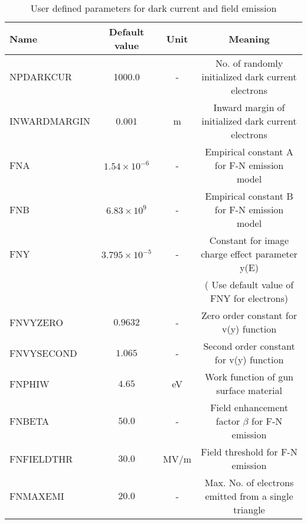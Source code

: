 \documentclass[a4paper,11pt]{article}
\begin{document}
\begin{table}[H]
\small
\caption{User defined parameters for dark current and field emission} %
\centering %
\begin{tabular}{lccc} %

 
\hline\hline %
Name & Default value & Unit & Meaning \\ [0.5ex] %
\hline %
NPDARKCUR & 1000.0 & - & No. of randomly initialized dark current electrons\\ %
INWARDMARGIN & 0.001 & m & Inward margin of initialized dark current electrons\\
FNA & $1.54\times10^{-6}$ & - & Empirical constant A for F-N emission model\\
FNB & $6.83\times10^9$ & - & Empirical constant B for F-N emission model \\
FNY & $3.795\times10^{-5}$ & - & Constant for image charge effect parameter y(E) \\ [1ex]%
 &  &  & ( Use default value of FNY for electrons) \\
FNVYZERO & $0.9632$ & - & Zero order constant for v(y) function \\
FNVYSECOND & $1.065$ & - & Second order constant for v(y) function \\ 
FNPHIW & $4.65$ & eV & Work function of gun surface material \\ 
FNBETA & $50.0$ & - & Field enhancement factor $\beta$ for F-N emission \\
FNFIELDTHR & $30.0$ & MV/m & Field threshold for F-N emission \\
FNMAXEMI & $20.0$ & - & Max. No. of electrons emitted from a single triangle \\
\hline %
\end{tabular} 
\label{table:nonlin} %
\end{table}
\end{document}
